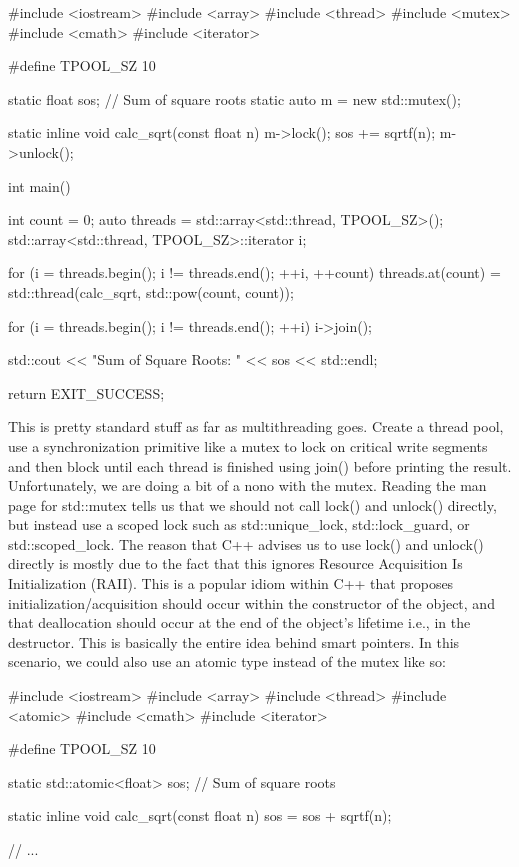 \documentclass{article}
\begin{document}
\begin{cpplst}
#include <iostream>
#include <array>
#include <thread>
#include <mutex>
#include <cmath>
#include <iterator>

#define TPOOL_SZ 10

static float sos; // Sum of square roots
static auto m = new std::mutex();

static inline void calc_sqrt(const float n)
{
    m->lock();
    sos += sqrtf(n);
    m->unlock();
}

int main()
{
    int count = 0;
    auto threads = std::array<std::thread, TPOOL_SZ>();
    std::array<std::thread, TPOOL_SZ>::iterator i;

    for (i = threads.begin(); i != threads.end(); ++i, ++count)
    {
        threads.at(count) = std::thread(calc_sqrt, std::pow(count, count));
    }

    for (i = threads.begin(); i != threads.end(); ++i)
    {
        i->join();
    }

    std::cout << "Sum of Square Roots: " << sos << std::endl;

   return EXIT_SUCCESS;
}
\end{cpplst}

This is pretty standard stuff as far as multithreading goes. Create a thread pool, use a synchronization
primitive like a mutex to lock on critical write segments and then block until each thread is finished using
join() before printing the result. Unfortunately, we are doing a bit of a nono with the mutex. Reading the
man page for std::mutex tells us that we should not call lock() and unlock() directly, but instead use a
scoped lock such as std::unique\_lock, std::lock\_guard, or std::scoped\_lock. The reason that C++ advises us
to use lock() and unlock() directly is mostly due to the fact that this ignores Resource Acquisition Is
Initialization (RAII). This is a popular idiom within C++ that proposes initialization/acquisition should
occur within the constructor of the object, and that deallocation should occur at the end of the object's
lifetime i.e., in the destructor. This is basically the entire idea behind smart pointers. In this scenario,
we could also use an atomic type instead of the mutex like so:

\begin{cpplst}
#include <iostream>
#include <array>
#include <thread>
#include <atomic>
#include <cmath>
#include <iterator>

#define TPOOL_SZ 10

static std::atomic<float> sos; // Sum of square roots

static inline void calc_sqrt(const float n)
{
    sos = sos + sqrtf(n);
}

// ...
\end{cpplst}
\end{document}
